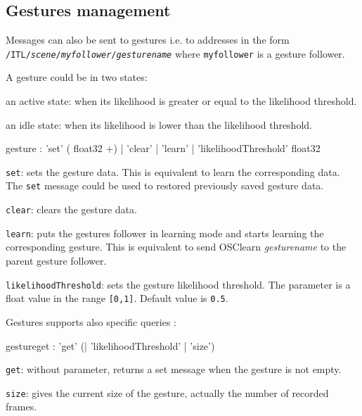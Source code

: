 \documentclass[a4paper,twoside]{report}
\newcommand{\subsublevel}[1]	{\subsection{#1}}
\newcommand{\OSC}[1]		{\texttt{#1}}
\newcommand{\values}[1]		{\texttt{#1}}
\let\olditemize\itemize
\let\oldenditemize\enditemize
\renewenvironment{itemize} 	{\olditemize \setlength{\itemsep}{1mm}}{\oldenditemize}
\begin{document}
\subsublevel{Gestures management}\label{gfgestures}

Messages can also be sent to gestures i.e. to addresses in the form \OSC{/ITL/\textit{scene}/\textit{myfollower}/\textit{gesturename}} where \OSC{myfollower} is a gesture follower.

A gesture could be in two states:
\begin{itemize}
\item an active state: when its likelihood is greater or equal to the likelihood threshold.
\item an idle state: when its likelihood is lower than the likelihood threshold.
\end{itemize}

\begin{rail}
gesture : 'set' ( float32 +)
		| 'clear'
		| 'learn'
 		| 'likelihoodThreshold' float32
\end{rail}


\begin{itemize}
\item \OSC{set}: sets the gesture data. This is equivalent to learn the corresponding data. The \OSC{set} message could be used to restored previously saved gesture data.
\item \OSC{clear}: clears the gesture data. 
\item \OSC{learn}: puts the gestures follower in learning mode and starts learning the corresponding gesture. This is equivalent to send OSC{learn \textit{gesturename}} to the parent gesture follower.
\item \OSC{likelihoodThreshold}: sets the gesture likelihood threshold. The parameter is a float value in the range \values{[0,1]}. Default value is \values{0.5}.
\end{itemize}

Gestures supports also specific queries :
\begin{rail}
gestureget : 'get' (| 'likelihoodThreshold' | 'size')
\end{rail}

\begin{itemize}
\item \OSC{get}: without parameter, returns a set message when the gesture is not empty.
\item \OSC{size}: gives the current size of the gesture, actually the number of recorded frames. 
\end{itemize}
\end{document}
